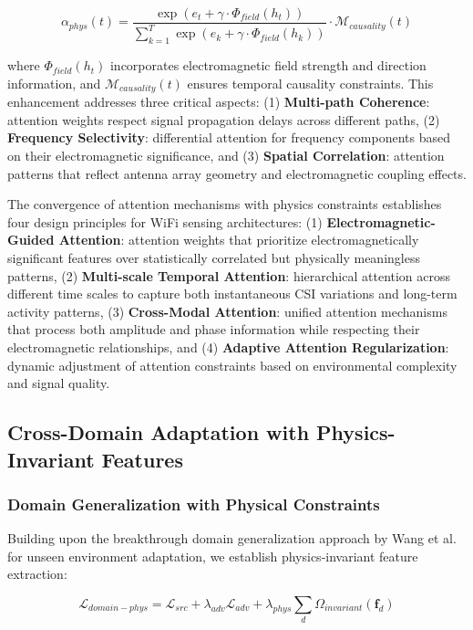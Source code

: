\documentclass[journal]{IEEEtran}
\begin{document}
\begin{equation}
\alpha_{phys}(t) = \frac{\exp(e_t + \gamma \cdot \Phi_{field}(h_t))}{\sum_{k=1}^{T} \exp(e_k + \gamma \cdot \Phi_{field}(h_k))} \cdot \mathcal{M}_{causality}(t)
\label{eq:physics_attention}
\end{equation}

where $\Phi_{field}(h_t)$ incorporates electromagnetic field strength and direction information, and $\mathcal{M}_{causality}(t)$ ensures temporal causality constraints. This enhancement addresses three critical aspects: (1) \textbf{Multi-path Coherence}: attention weights respect signal propagation delays across different paths, (2) \textbf{Frequency Selectivity}: differential attention for frequency components based on their electromagnetic significance, and (3) \textbf{Spatial Correlation}: attention patterns that reflect antenna array geometry and electromagnetic coupling effects.

The convergence of attention mechanisms with physics constraints establishes four design principles for WiFi sensing architectures: (1) \textbf{Electromagnetic-Guided Attention}: attention weights that prioritize electromagnetically significant features over statistically correlated but physically meaningless patterns, (2) \textbf{Multi-scale Temporal Attention}: hierarchical attention across different time scales to capture both instantaneous CSI variations and long-term activity patterns, (3) \textbf{Cross-Modal Attention}: unified attention mechanisms that process both amplitude and phase information while respecting their electromagnetic relationships, and (4) \textbf{Adaptive Attention Regularization}: dynamic adjustment of attention constraints based on environmental complexity and signal quality.

\subsection{Cross-Domain Adaptation with Physics-Invariant Features}

\subsubsection{Domain Generalization with Physical Constraints}

Building upon the breakthrough domain generalization approach by Wang et al. \cite{wang2022airfi} for unseen environment adaptation, we establish physics-invariant feature extraction:

\begin{equation}
\mathcal{L}_{domain-phys} = \mathcal{L}_{src} + \lambda_{adv} \mathcal{L}_{adv} + \lambda_{phys} \sum_{d} \Omega_{invariant}(\mathbf{f}_d)
\label{eq:domain_physics_loss}
\end{equation}
\end{document}
